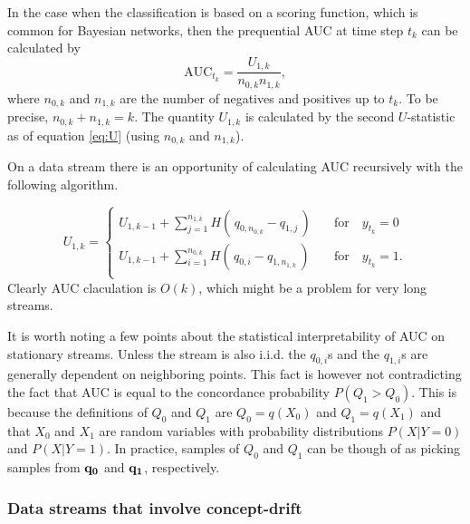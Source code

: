
In the case when the classification is based on a scoring function, which is common for Bayesian networks, then the prequential AUC at time step $t_k$ can be calculated by
\begin{equation}
\label{eq:prequentialAUC}
\mbox{AUC}_{t_k}= \frac{U_{1,k}}{n_{0,k}n_{1,k}},
\end{equation}
where $n_{0,k}$ and $n_{1,k}$ are the number of negatives and positives up to $t_k$.  To be precise, $n_{0,k} + n_{1,k} = k$.  The quantity $U_{1,k}$ is calculated by the second $U$-statistic as of equation \eqref{eq:U} (using $n_{0,k}$ and $n_{1,k}$).

On a data stream there is an opportunity of calculating AUC recursively with the following algorithm.

\begin{equation}
\label{eq:prequentialAUC2}
U_{1,k}= 
\begin{cases}
U_{1,k-1} + \sum_{j=1}^{n_{1,k}} H( \,q_{0,n_{0,k}} - q_{1,j}    \,)
 \quad &\mbox{for} \quad y_{t_k} = 0\\
U_{1,k-1} + \sum_{i=1}^{n_{0,k}} H( \,q_{0,i} - q_{1,n_{1,k}}    \,)
\quad &\mbox{for} \quad y_{t_k} = 1.\\
\end{cases}
\end{equation}
Clearly AUC claculation is $O(k)$, which might be a problem for very long streams.  

It is worth noting a few points about the statistical interpretability of AUC on stationary streams.  Unless the stream is also i.i.d. the $q_{0,i}$s and the $q_{1,i}$s are generally dependent on neighboring points.  This fact is however not contradicting the fact that AUC is equal to the concordance probability $ P(Q_1 > Q_0)$.  This is because the definitions of $Q_0$ and $Q_1$ are $Q_0 = q(X_0)$ and $Q_1 = q(X_1)$ and 
that $X_0$ and $X_1$ are random variables with probability distributions $P(X | Y = 0)$ and $P(X | Y = 1)$.  In practice, samples of $Q_0$ and $Q_1$ can be though of as picking samples from $\bv{q_0}$ and $\bv{q_1}$, respectively.

\subsubsection{Data streams that involve concept-drift}

